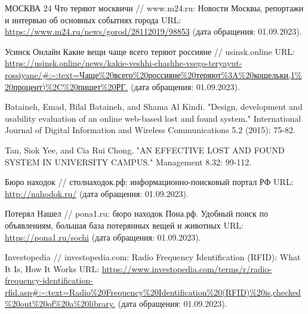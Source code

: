 \documentclass{mirea}
\begin{document}

\tableofcontents

%

%

%

%



%



\begin{thebibliography}{99\kern\bibindent}
	 МОСКВА 24 Что теряют москвичи // www.m24.ru: Новости Москвы, репортажи и интервью об основных событиях города URL: \url{https://www.m24.ru/news/gorod/28112019/98853} (дата обращения: 01.09.2023).
	
	 Усинск Онлайн Какие вещи чаще всего теряют россияне // usinsk.online URL: \url{https://usinsk.online/news/kakie-veshhi-chashhe-vsego-teryayut-rossiyane/#:~:text=Чаще%20всего%20россияне%20теряют%3A%20кошельки,1%20процент)%2C%20пишет%20РГ.} (дата обращения: 01.09.2023).
	
	 Bataineh, Emad, Bilal Bataineh, and Shama Al Kindi. "Design, development and usability evaluation of an online web-based lost and found system." International Journal of Digital Information and Wireless Communications 5.2 (2015): 75-82. %
	
	 Tan, Siok Yee, and Cia Rui Chong. "AN EFFECTIVE LOST AND FOUND SYSTEM IN UNIVERSITY CAMPUS." Management 8.32: 99-112. %
	
	
	 Бюро находок // столнаходок.рф: информационно-поисковый портал РФ URL: \url{http://nahodok.ru/} (дата обращения: 01.09.2023).
	
	 Потерял Нашел // pona1.ru: бюро находок Пона.рф. Удобный поиск по объявлениям, большая база потерянных вещей и животных URL: \url{https://pona1.ru/sochi} (дата обращения: 01.09.2023).
	
	 Investopedia // investopedia.com: Radio Frequency Identification (RFID): What It Is, How It Works URL: \url{https://www.investopedia.com/terms/r/radio-frequency-identification-rfid.asp#:~:text=Radio%20Frequency%20Identification%20(RFID)%20is,checked%20out%20of%20a%20library.} (дата обращения: 01.09.2023).
	

\end{thebibliography}
\end{document}
